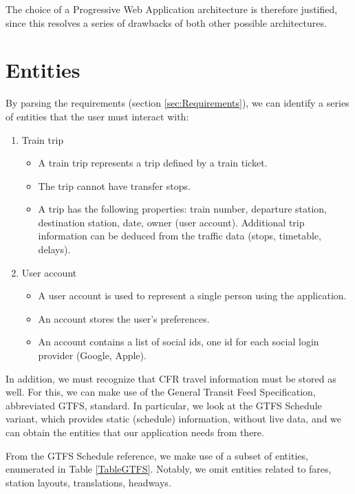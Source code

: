 The choice of a Progressive Web Application architecture is therefore justified, since this resolves a series of drawbacks of both other possible architectures.

\section{Entities}
\label{sec:Entities}
By parsing the requirements (section \ref{sec:Requirements}), we can identify a series of entities that the user must interact with:

\begin{enumerate}
    \item Train trip
          \begin{itemize}
              \item A train trip represents a trip defined by a train ticket.
              \item The trip cannot have transfer stops.
              \item A trip has the following properties: train number, departure station, destination station, date, owner (user account). Additional trip information can be deduced from the traffic data (stops, timetable, delays).
          \end{itemize}
    \item User account
          \begin{itemize}
              \item A user account is used to represent a single person using the application.
              \item An account stores the user's preferences.
              \item An account contains a list of social ids, one id for each social login provi\-der (Google, Apple).
          \end{itemize}
\end{enumerate}

In addition, we must recognize that CFR travel information must be stored as well. For this, we can make use of the General Transit Feed Specification, abbreviated GTFS, standard. In particular, we look at the GTFS Schedule variant, which provides static (schedule) information, without live data, and we can obtain the entities that our application needs from there.

From the GTFS Schedule reference, we make use of a subset of entities, enumerated in Table \ref{TableGTFS}. Notably, we omit entities related to fares, station layouts, translations, headways.

